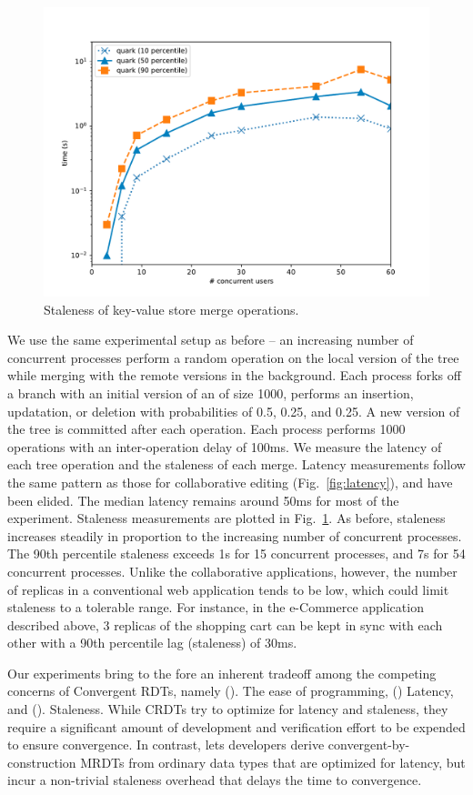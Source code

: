 \begin{figure}[ht]
  \centering
    \includegraphics[scale=0.4]{Figures/rbmonkey_staleness}
  \caption{Staleness of key-value store merge operations.}
\label{fig:rb-staleness}
\end{figure}

We use the same experimental setup as before -- an increasing number
of concurrent processes perform a random operation on the local
version of the tree while merging with the remote versions in the
background.  Each process forks off a branch with an initial version
of an  of size 1000, performs an insertion, updatation, or
deletion with probabilities of 0.5, 0.25, and 0.25. A new version of
the tree is committed after each operation. Each process performs 1000
operations with an inter-operation delay of 100ms. We measure the
latency of each tree operation and the staleness of each merge.
Latency measurements follow the same pattern as those for
collaborative editing (Fig.~\ref{fig:latency}), and have been elided.
The median latency remains around 50ms for most of the experiment.
Staleness measurements are plotted in Fig.~\ref{fig:rb-staleness}. As
before, staleness increases steadily in proportion to the increasing
number of concurrent processes. The 90th percentile staleness exceeds
1s for 15 concurrent processes, and 7s for 54 concurrent processes.
Unlike the collaborative applications, however, the number of replicas
in a conventional web application tends to be low, which could limit
staleness to a tolerable range. For instance, in the e-Commerce
application described above, 3 replicas of the shopping cart can be
kept in sync with each other with a 90th percentile lag (staleness) of
30ms.

Our experiments bring to the fore an inherent tradeoff among the
competing concerns of Convergent RDTs, namely (). The ease of
programming, () Latency, and ().  Staleness. While CRDTs
try to optimize for latency and staleness, they require a significant
amount of development and verification effort to be expended to ensure
convergence. In contrast, \quark lets developers derive
convergent-by-construction MRDTs from ordinary data types that are
optimized for latency, but incur a non-trivial staleness overhead that
delays the time to convergence. 


